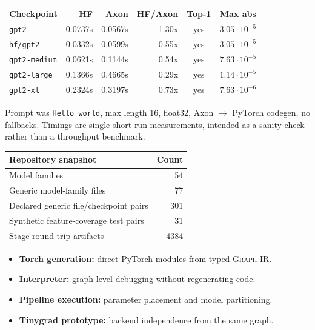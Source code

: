 \documentclass{article}
\newcommand{\graphir}{\textsc{Graph IR}}
\newcommand{\code}[1]{\texttt{#1}}
\begin{document}
\begin{tcolorbox}[posterbox,title={Full GPT-2 KV Axon Model}]
\begin{minipage}[t]{0.32\linewidth}
\begin{tcolorbox}[accentbox]
{{\fontsize{14.2}{17}\selectfont
\begin{tabular}{@{}lrrrcc@{}}
\toprule
Checkpoint & HF & Axon & HF/Axon & Top-1 & Max abs \\
\midrule
\code{gpt2} & 0.0737s & 0.0567s & 1.30x & yes & $3.05{\cdot}10^{-5}$ \\
\code{hf/gpt2} & 0.0332s & 0.0599s & 0.55x & yes & $3.05{\cdot}10^{-5}$ \\
\code{gpt2-medium} & 0.0621s & 0.1144s & 0.54x & yes & $7.63{\cdot}10^{-5}$ \\
\code{gpt2-large} & 0.1366s & 0.4665s & 0.29x & yes & $1.14{\cdot}10^{-5}$ \\
\code{gpt2-xl} & 0.2324s & 0.3197s & 0.73x & yes & $7.63{\cdot}10^{-6}$ \\
\bottomrule
\end{tabular}\par\medskip
}

Prompt was \code{Hello world}, max length 16, float32, Axon $\rightarrow$ PyTorch
codegen, no fallbacks. Timings are single short-run measurements, intended as a
sanity check rather than a throughput benchmark.\par}
\end{tcolorbox}
\end{minipage}
\end{tcolorbox}

\vspace{8mm}

\begin{tcolorbox}[posterbox,title={Evaluation Snapshot and Backends}]
{\raggedright\fontsize{22}{28}\selectfont
\begin{minipage}[t]{0.49\linewidth}
\begin{tabular}{@{}lr@{}}
\toprule
Repository snapshot & Count \\
\midrule
Model families & 54 \\
Generic model-family files & 77 \\
Declared generic file/checkpoint pairs & 301 \\
Synthetic feature-coverage test pairs & 31 \\
Stage round-trip artifacts & 4384 \\
\bottomrule
\end{tabular}
\end{minipage}
\hfill
\begin{minipage}[t]{0.49\linewidth}
\begin{itemize}
\setlength\itemsep{1mm}
\item \textbf{Torch generation:} direct PyTorch modules from typed \graphir.
\item \textbf{Interpreter:} graph-level debugging without regenerating code.
\item \textbf{Pipeline execution:} parameter placement and model partitioning.
\item \textbf{Tinygrad prototype:} backend independence from the same graph.
\end{itemize}
\end{minipage}
}
\end{tcolorbox}
\end{document}
